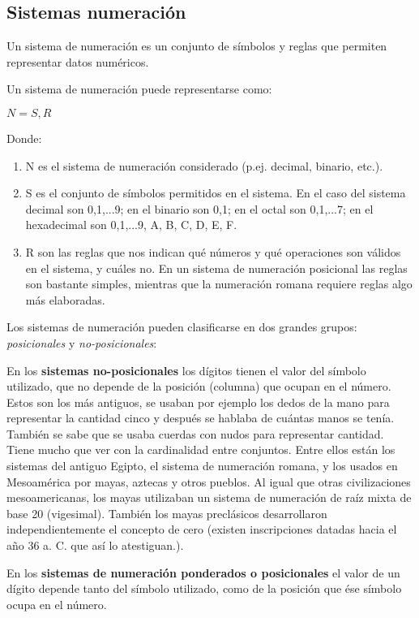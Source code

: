 \subsection{Sistemas numeración}
Un sistema de numeración es un conjunto de símbolos y reglas que permiten representar datos numéricos. 

Un sistema de numeración puede representarse como:

$N={S, R}$

Donde:
\begin{enumerate}
	\item N es el sistema de numeración considerado (p.ej. decimal, binario, etc.).
	\item S es el conjunto de símbolos permitidos en el sistema. En el caso del sistema decimal son {0,1,...9}; en el binario son {0,1}; en el octal son {0,1,...7}; en el hexadecimal son {0,1,...9, A, B, C, D, E, F}.
	\item R son las reglas que nos indican qué números y qué operaciones son válidos en el sistema, y cuáles no. En un sistema de numeración posicional las reglas son bastante simples, mientras que la numeración romana requiere reglas algo más elaboradas.
\end{enumerate}

Los sistemas de numeración pueden clasificarse en dos grandes grupos: {\em posicionales} y {\em no-posicionales}:

En los {\bf sistemas no-posicionales} los dígitos tienen el valor del símbolo utilizado, que no depende de la posición (columna) que ocupan en el número. Estos son los más antiguos, se usaban por ejemplo los dedos de la mano para representar la cantidad cinco y después se hablaba de cuántas manos se tenía. También se sabe que se usaba cuerdas con nudos para representar cantidad. Tiene mucho que ver con la cardinalidad entre conjuntos. Entre ellos están los sistemas del antiguo Egipto, el sistema de numeración romana, y los usados en Mesoamérica por mayas, aztecas y otros pueblos.
Al igual que otras civilizaciones mesoamericanas, los mayas utilizaban un sistema de numeración de raíz mixta de base 20 (vigesimal). También los mayas preclásicos desarrollaron independientemente el concepto de cero (existen inscripciones datadas hacia el año 36 a. C. que así lo atestiguan.).

En los {\bf sistemas de numeración ponderados o posicionales} el valor de un dígito depende tanto del símbolo utilizado, como de la posición que ése símbolo ocupa en el número.

